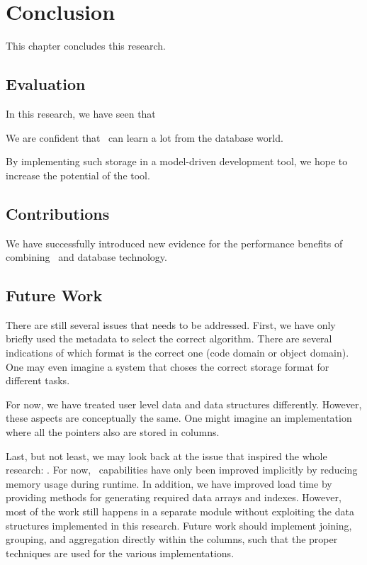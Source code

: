 \chapter{Conclusion}
\label{chap:Conclusion}
This chapter concludes this research. 

\clearpage

\section{Evaluation}
\label{sec:Evaluation}
In this research, we have seen that 

We are confident that \mdd~can learn a lot from the database world.

By implementing such storage in a model-driven development tool, we hope to increase the potential of the tool.

\section{Contributions}
\label{sec:Contributions}
We have successfully introduced new evidence for the performance benefits of combining \mdd~and database technology.

\section{Future Work}
\label{sec:Future Work}



There are still several issues that needs to be addressed. First, we have only briefly used the metadata to select the correct algorithm. There are several indications of which format is the correct one (code domain or object domain). One may even imagine a system that choses the correct storage format for different tasks.

For now, we have treated user level data and data structures differently. However, these aspects are conceptually the same. One might imagine an implementation where all the pointers also are stored in columns.

Last, but not least, we may look back at the issue that inspired the whole research: \bd. For now, \bd~capabilities have only been improved implicitly by reducing memory usage during runtime. In addition, we have improved load time by providing methods for generating required data arrays and indexes. However, most of the work still happens in a separate module without exploiting the data structures implemented in this research. Future work should implement joining, grouping, and aggregation directly within the columns, such that the proper techniques are used for the various implementations.

